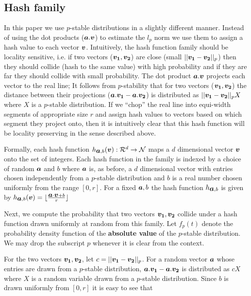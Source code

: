 \documentclass[12pt]{article}
\newcommand{\bm}[1]{\mbox{\boldmath$#1$}}
\begin{document}
\subsection{Hash family}
\label{subsec:family}
In this paper we use $p$-stable distributions in a slightly different
manner. Instead of using the dot products ($\bm{a}.\bm{v}$) to estimate
the $l_p$ norm we use them to assign a hash value to each vector
$\bm{v}$. Intuitively, the hash function family should be locality
sensitive, i.e. if two vectors ($\bm{v_1}, \bm{v_2}$) are close (small
$||\bm{v_1}-\bm{v_2}||_p$) then they should collide (hash to the same
value) with high probability and if they are far they should collide with
small probability. The dot product $\bm{a}.\bm{v}$ projects each vector to the
real line; It follows from $p$-stability that for two vectors
($\bm{v_1},\bm{v_2}$) the distance between their projections
($\bm{a}.\bm{v_1} - \bm{a}.\bm{v_2}$) is distributed as $||\bm{v_1}-\bm{v_2}||_p X$
where $X$ is a $p$-stable distribution. If we ``chop'' the real line into
equi-width segments of appropriate size $r$ and assign hash values to vectors
based on which segment they project onto, then it is intuitively clear
that this hash function will be locality preserving in the sense described
above.

Formally, each hash function $h_{\bm{a},b}(\bm{v}): {\cal R}^d \rightarrow
{\cal N}$ maps a $d$ dimensional vector $\bm{v}$ onto the set of
integers. Each hash function in the family is indexed by a choice of
random $\bm{a}$ and $b$ where $\bm{a}$ is, as before, a $d$ dimensional
vector with entries chosen independently from a $p$-stable
distribution and $b$ is a real number chosen uniformly from the range
$[0,r]$. For a fixed $\bm{a},b$ the hash function $h_{\bm{a},b}$ is given by
$h_{\bm{a},b}(\bm{v})=\lfloor{\bm{a} \cdot \bm{v}+b\over r}\rfloor$

Next, we compute the probability that two vectors $\bm{v_1}, \bm{v_2}$
collide under a hash function drawn uniformly at random from this
family. Let $f_p(t)$ denote the probability density function of the
{\bf absolute value} of the $p$-stable distribution. We may drop the subscript
$p$ whenever it is clear from the context.

 For the two vectors $\bm{v_1},
\bm{v_2}$, let $c = ||\bm{v_1} - \bm{v_2}||_p$. For a random vector $\bm{a}$ whose entries are
drawn from a $p$-stable distribution, $\bm{a}.\bm{v_1} -
\bm{a}.\bm{v_2}$ is distributed as $c X$ where $X$ is a random variable
drawn from a $p$-stable distribution. Since $b$ is
drawn uniformly from $[0,r]$ it is easy to see that
\end{document}
